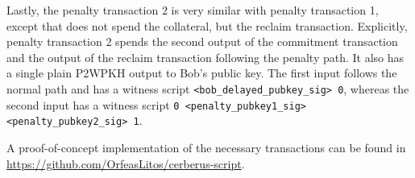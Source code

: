 \documentclass[runningheads]{llncs}
\begin{document}
Lastly, the penalty transaction 2 is very similar with penalty transaction 1, except that does not spend the collateral, but the reclaim transaction. Explicitly, penalty transaction 2 spends the second output of the commitment transaction and the output of the reclaim transaction following the penalty path. It also has a single plain P2WPKH output to Bob's public key. The first input follows the normal path and has a witness script \texttt{<bob\_delayed\_pubkey\_sig> 0}, whereas the second input has a witness script \texttt{0 <penalty\_pubkey1\_sig> <penalty\_pubkey2\_sig> 1}.

A proof-of-concept implementation of the necessary transactions can be found in
\url{https://github.com/OrfeasLitos/cerberus-script}.
\end{document}
